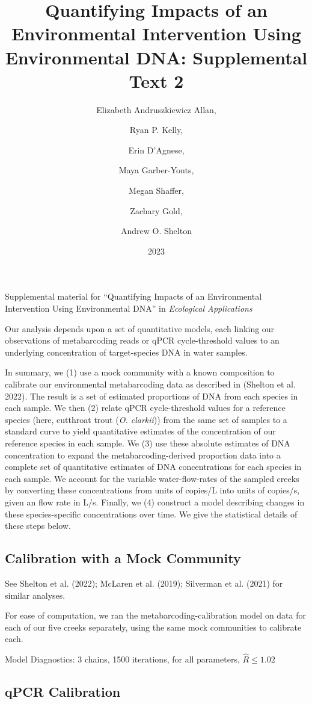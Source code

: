 \documentclass[
]{article}
\title{Quantifying Impacts of an Environmental Intervention Using
Environmental DNA: Supplemental Text 2}
\author{Elizabeth Andruszkiewicz Allan, \and Ryan P. Kelly, \and Erin
D'Agnese, \and Maya Garber-Yonts, \and Megan Shaffer, \and Zachary
Gold, \and Andrew O. Shelton}
\date{2023}
\begin{document}
\maketitle

Supplemental material for ``Quantifying Impacts of an Environmental
Intervention Using Environmental DNA'' in
\textit{Ecological Applications}

Our analysis depends upon a set of quantitative models, each linking our
observations of metabarcoding reads or qPCR cycle-threshold values to an
underlying concentration of target-species DNA in water samples.

In summary, we (1) use a mock community with a known composition to
calibrate our environmental metabarcoding data as described in (Shelton
et al. 2022). The result is a set of estimated proportions of DNA from
each species in each sample. We then (2) relate qPCR cycle-threshold
values for a reference species (here, cutthroat trout (\emph{O.
clarkii})) from the same set of samples to a standard curve to yield
quantitative estimates of the concentration of our reference species in
each sample. We (3) use these absolute estimates of DNA concentration to
expand the metabarcoding-derived proportion data into a complete set of
quantitative estimates of DNA concentrations for each species in each
sample. We account for the variable water-flow-rates of the sampled
creeks by converting these concentrations from units of copies/L into
units of copies/s, given an flow rate in L/s. Finally, we (4) construct
a model describing changes in these species-specific concentrations over
time. We give the statistical details of these steps below.

\hypertarget{calibration-with-a-mock-community}{%
\subsection{Calibration with a Mock
Community}\label{calibration-with-a-mock-community}}

See Shelton et al. (2022); McLaren et al. (2019); Silverman et al.
(2021) for similar analyses.

For ease of computation, we ran the metabarcoding-calibration model on
data for each of our five creeks separately, using the same mock
communities to calibrate each.

Model Diagnostics: 3 chains, 1500 iterations, for all parameters,
\(\hat{R} \leq 1.02\)

\hypertarget{qpcr-calibration}{%
\subsection{qPCR Calibration}\label{qpcr-calibration}}
\end{document}
